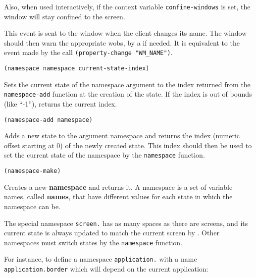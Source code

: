 Also, when used interactively, if the context variable \verb|confine-windows|
is set, the window will stay confined to the screen.

        

This event is sent to the window when the client changes its name.  The
window should then warn the appropriate wobs, by a  if
needed. It is equivalent to the event made by the call 
\verb|(property-change "WM_NAME")|.


{\usagefont\begin{verbatim}
(namespace namespace current-state-index)
\end{verbatim}}\usageupspace

Sets the current state of the namespace argument to the index returned
from the
\verb"namespace-add" function at the creation of the state. If the index is
out of bounds (like ``-1''), returns the current index.


{\usagefont\begin{verbatim}
(namespace-add namespace)
\end{verbatim}}\usageupspace

Adds a new state to the argument namespace and returns the index (numeric
offset starting at 0) of the newly created state. This index should then be
used to set the current state of the namespace by the \verb"namespace"
function.


{\usagefont\begin{verbatim}
(namespace-make)
\end{verbatim}}\usageupspace

Creates a new {\bf namespace} and returns it. A namespace is a set of
variable names, called {\bf names}, that have different values for each
state in which the namespace can be. 

The special namespace \verb"screen." has as many spaces as there are
screens, and its current state is always updated to match the current screen
by {\GWM}. Other namespaces must switch states by the \verb"namespace"
function.

For instance, to define a namespace \verb"application." with a name
\verb"application.border" which will depend on the current application:


